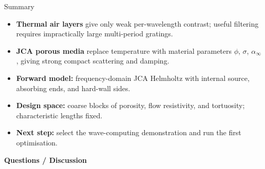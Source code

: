 \documentclass[aspectratio=169,11pt]{beamer}
\begin{document}
\begin{frame}{Summary}
  \begin{itemize}
    \item \textbf{Thermal air layers} give only weak per-wavelength contrast; useful filtering requires impractically large multi-period gratings.
    \item \textbf{JCA porous media} replace temperature with material parameters $\phi$, $\sigma$, $\alpha_\infty$, giving strong compact scattering and damping.
    \item \textbf{Forward model:} frequency-domain JCA Helmholtz with internal source, absorbing ends, and hard-wall sides.
    \item \textbf{Design space:} coarse blocks of porosity, flow resistivity, and tortuosity; characteristic lengths fixed.
    \item \textbf{Next step:} select the wave-computing demonstration and run the first optimisation.
  \end{itemize}

  \vspace{0.4cm}
  \begin{center}
    \Large\textbf{\textcolor{gdpPurple}{Questions / Discussion}}
  \end{center}
\end{frame}
\end{document}
